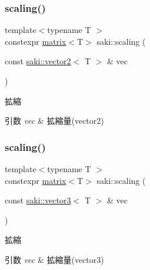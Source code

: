 \mbox{\label{namespacesaki_abda5ab30bf4dc9240857d62d56e590f9}} 
\subsubsection{\texorpdfstring{scaling()}{scaling()}\hspace{0.1cm}{\footnotesize\ttfamily [1/3]}}
{\footnotesize\ttfamily template$<$typename T $>$ \\
constexpr \mbox{\hyperlink{classsaki_1_1matrix}{matrix}}$<$T$>$ saki\+::scaling (\begin{DoxyParamCaption}\item[{const \mbox{\hyperlink{classsaki_1_1vector2}{saki\+::vector2}}$<$ T $>$ \&}]{vec }\end{DoxyParamCaption})}



拡縮 


\begin{DoxyParams}{引数}
{\em vec} & 拡縮量(vector2) \\
\hline
\end{DoxyParams}
\mbox{\label{namespacesaki_affcd920fe27abc17e5fa50f04bfabe05}} 
\subsubsection{\texorpdfstring{scaling()}{scaling()}\hspace{0.1cm}{\footnotesize\ttfamily [2/3]}}
{\footnotesize\ttfamily template$<$typename T $>$ \\
constexpr \mbox{\hyperlink{classsaki_1_1matrix}{matrix}}$<$T$>$ saki\+::scaling (\begin{DoxyParamCaption}\item[{const \mbox{\hyperlink{classsaki_1_1vector3}{saki\+::vector3}}$<$ T $>$ \&}]{vec }\end{DoxyParamCaption})}



拡縮 


\begin{DoxyParams}{引数}
{\em vec} & 拡縮量(vector3) \\
\hline
\end{DoxyParams}
\mbox{\label{namespacesaki_aededd0f357c48d1e96af77b06cb3e786}} 

